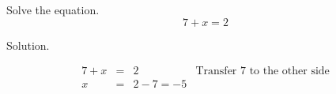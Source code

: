 \begin{frame}
\begin{example}
Solve the equation. 
\[
7+x = 2 
\]

Solution.

\[
\begin{array}{rcll}
7+x &=& 2&\text{Transfer }7\text{ to the other side}\\
x&=&2-7=-5
\end{array}
\]
\end{example}
\end{frame}